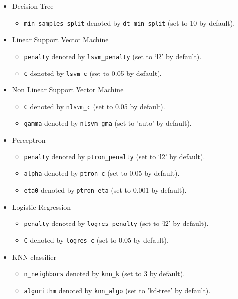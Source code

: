 \documentclass[12pt]{article}
\begin{document}
\begin{itemize}
\item Decision Tree
\begin{itemize}
\item \texttt{min\_samples\_split} denoted by \texttt{dt\_min\_split} (set to 10 by default).
\end{itemize}
\item Linear Support Vector Machine
\begin{itemize}
\item \texttt{penalty} denoted by \texttt{lsvm\_penalty} (set to `l2' by default).
\item \texttt{C} denoted by \texttt{lsvm\_c} (set to 0.05 by default).
\end{itemize}
\item Non Linear Support Vector Machine
\begin{itemize}
\item \texttt{C} denoted by \texttt{nlsvm\_c} (set to 0.05 by default).
\item \texttt{gamma} denoted by \texttt{nlsvm\_gma} (set to 'auto' by default).
\end{itemize}
\item Perceptron
\begin{itemize}
\item \texttt{penalty} denoted by \texttt{ptron\_penalty} (set to `l2' by default).
\item \texttt{alpha} denoted by \texttt{ptron\_c} (set to 0.05 by default).
\item \texttt{eta0} denoted by \texttt{ptron\_eta} (set to 0.001 by default).
\end{itemize}
\item Logistic Regression
\begin{itemize}
\item \texttt{penalty} denoted by \texttt{logres\_penalty} (set to `l2' by default).
\item \texttt{C} denoted by \texttt{logres\_c} (set to 0.05 by default).
\end{itemize}
\item KNN classifier
\begin{itemize}
\item \texttt{n\_neighbors} denoted by \texttt{knn\_k} (set to 3 by default).
\item \texttt{algorithm} denoted by \texttt{knn\_algo} (set to 'kd-tree' by default).
\end{itemize}
\end{itemize}
\end{document}
